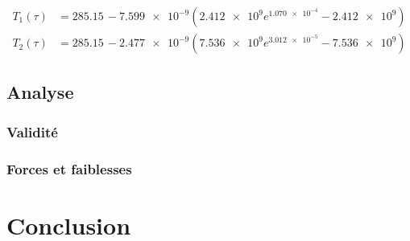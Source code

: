 \documentclass[12pt]{article}
\numberwithin{figure}{section}
\begin{document}
\begin{align*}
    T_1(\tau) &= 285.15\, -\num{7.599e-9} \left(\num{2.412e9} e^{\num{1.070e-4}}-\num{2.412e9}\right)\\
    T_2(\tau) &= 285.15\, -\num{2.477e-9} \left(\num{7.536e9} e^{\num{3.012e-5}}-\num{7.536e9}\right)
\end{align*}

\subsection{Analyse}
\subsubsection{Validit\'e}
\subsubsection{Forces et faiblesses}

\section{Conclusion}

\clearpage
\end{document}
